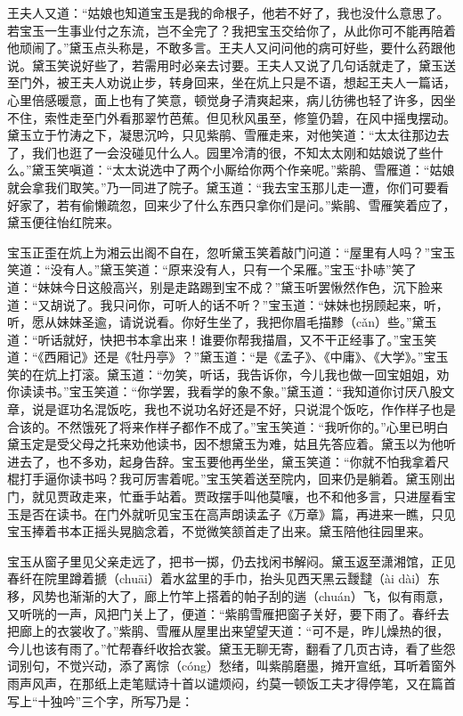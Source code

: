 \documentclass[12pt,oneside]{book}
\begin{document}
王夫人又道：“姑娘也知道宝玉是我的命根子，他若不好了，我也没什么意思了。若宝玉一生事业付之东流，岂不全完了？我把宝玉交给你了，从此你可不能再陪着他顽闹了。”黛玉点头称是，不敢多言。王夫人又问问他的病可好些，要什么药跟他说。黛玉笑说好些了，若需用时必亲去讨要。王夫人又说了几句话就走了，黛玉送至门外，被王夫人劝说止步，转身回来，坐在炕上只是不语，想起王夫人一篇话，心里倍感暖意，面上也有了笑意，顿觉身子清爽起来，病儿彷彿也轻了许多，因坐不住，索性走至门外看那翠竹芭蕉。但见秋风虽至，修篁仍碧，在风中摇曳摆动。黛玉立于竹涛之下，凝思沉吟，只见紫鹃、雪雁走来，对他笑道：“太太往那边去了，我们也逛了一会没碰见什么人。园里冷清的很，不知太太刚和姑娘说了些什么。”黛玉笑嗔道：“太太说选中了两个小厮给你两个作亲呢。”紫鹃、雪雁道：“姑娘就会拿我们取笑。”乃一同进了院子。黛玉道：“我去宝玉那儿走一遭，你们可要看好家了，若有偷懒疏忽，回来少了什么东西只拿你们是问。”紫鹃、雪雁笑着应了，黛玉便往怡红院来。

宝玉正歪在炕上为湘云出阁不自在，忽听黛玉笑着敲门问道：“屋里有人吗？”宝玉笑道：“没有人。”黛玉笑道：“原来没有人，只有一个呆雁。”宝玉“扑哧”笑了道：“妹妹今日这般高兴，别是走路踢到宝不成？”黛玉听罢愀然作色，沉下脸来道：“又胡说了。我只问你，可听人的话不听？”宝玉道：“妹妹也拐顾起来，听，听，愿从妹妹圣逾，请说说看。你好生坐了，我把你眉毛描黪（cǎn）些。”黛玉道：“听话就好，快把书本拿出来！谁要你帮我描眉，又不干正经事了。”宝玉笑道：“《西厢记》还是《牡丹亭》？”黛玉道：“是《孟子》、《中庸》、《大学》。”宝玉笑的在炕上打滚。黛玉道：“勿笑，听话，我告诉你，今儿我也做一回宝姐姐，劝你读读书。”宝玉笑道：“你学罢，我看学的象不象。”黛玉道：“我知道你讨厌八股文章，说是诓功名混饭吃，我也不说功名好还是不好，只说混个饭吃，作作样子也是合该的。不然饿死了将来作样子都作不成了。”宝玉笑道：“我听你的。”心里已明白黛玉定是受父母之托来劝他读书，因不想黛玉为难，姑且先答应着。黛玉以为他听进去了，也不多劝，起身告辞。宝玉要他再坐坐，黛玉笑道：“你就不怕我拿着尺棍打手逼你读书吗？我可厉害着呢。”宝玉笑着送至院内，回来仍是躺着。黛玉刚出门，就见贾政走来，忙垂手站着。贾政摆手叫他莫嚷，也不和他多言，只进屋看宝玉是否在读书。在门外就听见宝玉在高声朗读孟子《万章》篇，再进来一瞧，只见宝玉捧着书本正摇头晃脑念着，不觉微笑颔首走了出来。黛玉陪他往园里来。

宝玉从窗子里见父亲走远了，把书一掷，仍去找闲书解闷。黛玉返至潇湘馆，正见春纤在院里蹲着搋（chuāi）着水盆里的手巾，抬头见西天黑云靉靆（ài dài）东移，风势也渐渐的大了，廊上竹竿上搭着的帕子刮的遄（chuán）飞，似有雨意，又听咣的一声，风把门关上了，便道：“紫鹃雪雁把窗子关好，要下雨了。春纤去把廊上的衣裳收了。”紫鹃、雪雁从屋里出来望望天道：“可不是，昨儿燥热的很，今儿也该有雨了。”忙帮春纤收拾衣裳。黛玉无聊无寄，翻看了几页古诗，看了些怨词别句，不觉兴动，添了离悰（cóng）愁绪，叫紫鹃磨墨，摊开宣纸，耳听着窗外雨声风声，在那纸上走笔赋诗十首以谴烦闷，约莫一顿饭工夫才得停笔，又在篇首写上“十独吟”三个字，所写乃是：
\end{document}
